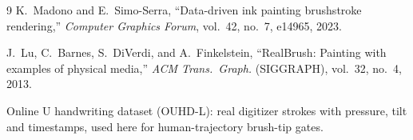 \documentclass[conference]{IEEEtran}
\begin{document}
\begin{thebibliography}{9}
K.~Madono and E.~Simo-Serra, ``Data-driven ink painting brushstroke
rendering,'' \emph{Computer Graphics Forum}, vol.~42, no.~7, e14965, 2023.

J.~Lu, C.~Barnes, S.~DiVerdi, and A.~Finkelstein, ``RealBrush: Painting with
examples of physical media,'' \emph{ACM Trans.\ Graph.} (SIGGRAPH), vol.~32,
no.~4, 2013.

Online U handwriting dataset (OUHD-L): real digitizer strokes with pressure,
tilt and timestamps, used here for human-trajectory brush-tip gates.
\end{thebibliography}
\end{document}
